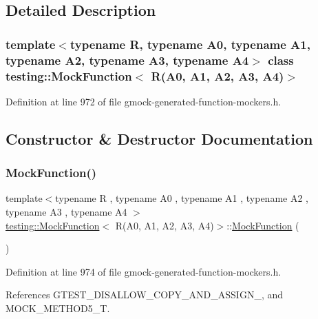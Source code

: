 \subsection{Detailed Description}
\subsubsection*{template$<$typename R, typename A0, typename A1, typename A2, typename A3, typename A4$>$\newline
class testing\+::\+Mock\+Function$<$ R(\+A0, A1, A2, A3, A4)$>$}



Definition at line 972 of file gmock-\/generated-\/function-\/mockers.\+h.



\subsection{Constructor \& Destructor Documentation}
\mbox{\label{classtesting_1_1MockFunction_3_01R_07A0_00_01A1_00_01A2_00_01A3_00_01A4_08_4_a8f54e305eb5e5cf5f7da836937e159ef}} 
\subsubsection{\texorpdfstring{Mock\+Function()}{MockFunction()}}
{\footnotesize\ttfamily template$<$typename R , typename A0 , typename A1 , typename A2 , typename A3 , typename A4 $>$ \\
\hyperlink{classtesting_1_1MockFunction}{testing\+::\+Mock\+Function}$<$ R(A0, A1, A2, A3, A4)$>$\+::\hyperlink{classtesting_1_1MockFunction}{Mock\+Function} (\begin{DoxyParamCaption}{ }\end{DoxyParamCaption})\hspace{0.3cm}{\ttfamily [inline]}}



Definition at line 974 of file gmock-\/generated-\/function-\/mockers.\+h.



References G\+T\+E\+S\+T\+\_\+\+D\+I\+S\+A\+L\+L\+O\+W\+\_\+\+C\+O\+P\+Y\+\_\+\+A\+N\+D\+\_\+\+A\+S\+S\+I\+G\+N\+\_\+, and M\+O\+C\+K\+\_\+\+M\+E\+T\+H\+O\+D5\+\_\+T.


